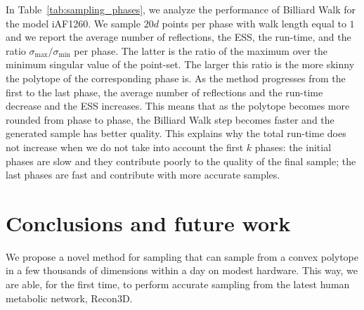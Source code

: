    In Table~\ref{tab:sampling_phases}, we analyze the
   performance of
   Billiard Walk for the model iAF1260. We sample $20d$ points per
   phase with walk length equal to $1$ and we report the average number of
   reflections, the ESS, the run-time, and the ratio $\sigma_{\max} / \sigma_{\min}$
   per phase. 
   The latter is the ratio of the maximum over the minimum singular
   value of the point-set. 
   The larger this ratio is the more skinny the polytope of
   the corresponding phase is. 
   As the method progresses from the first to the last
   phase, the average number of reflections and the run-time decrease and the ESS
   increases. This means that as the polytope becomes more rounded from phase to
   phase, the Billiard Walk step becomes faster and the generated sample has better
   quality. This explains why the total run-time does not increase when we do not
   take into account the first  $k$ phases: the initial phases are slow and
   they  contribute poorly to the  quality of the final sample; the last phases are
   fast and contribute with more accurate samples.
 
 
 
 \section{Conclusions and future work}
 \label{sec:conclusion}
 
   We propose a novel method for sampling that can sample from a convex
   polytope in a few thousands of dimensions within a day on modest hardware. 
   This way, we are able, for the first time, to perform accurate sampling from the
   latest human metabolic network, Recon3D.

